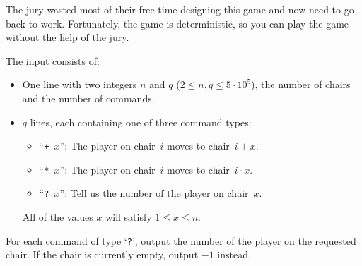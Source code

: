 The jury wasted most of their free time designing this game and now need to go back to work.
Fortunately, the game is deterministic, so you can play the game without the help of the jury.

\begin{Input}
The input consists of:
\begin{itemize}
  \item
  One line with two integers $n$ and $q$ ($2\leq n,q\leq5\cdot10^5$), the number of chairs and the number of commands.
  \item
  $q$ lines, each containing one of three command types:
  \begin{itemize}[topsep=0pt, itemsep=-2pt]
  \item ``\texttt{+~$x$}'': The player on chair~$i$ moves to chair~$i+x$.
  \item ``\texttt{*~$x$}'': The player on chair~$i$ moves to chair~$i\cdot{}x$.
  \item ``\texttt{?~$x$}'': Tell us the number of the player on chair~$x$.
  \end{itemize}
  All of the values $x$ will satisfy $1 \leq x \leq n$.
  \end{itemize}
\end{Input}
\begin{Output}
  For each command of type `\texttt{?}', output the number of the player on the requested chair.
  If the chair is currently empty, output $-1$ instead.
\end{Output}
